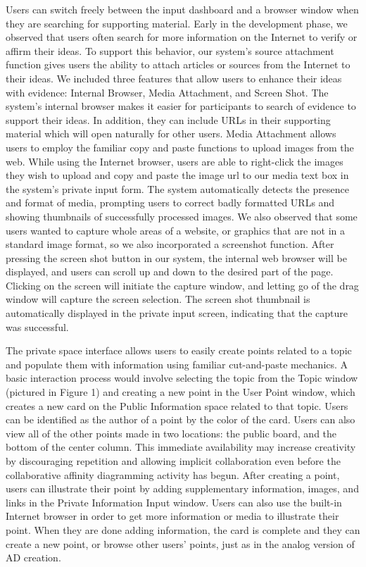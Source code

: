 \documentclass{sigchi}
\begin{document}
Users can switch freely between the input dashboard and a browser window when they are searching for supporting material.  Early in the development phase, we observed that users often search for more information on the Internet to verify or affirm their ideas. To support this behavior, our system's source attachment function gives users the ability to attach articles or sources from the Internet to their ideas. We included three features that allow users to enhance their ideas with evidence: Internal Browser, Media Attachment, and Screen Shot. The system's internal browser makes it easier for participants to search of evidence to support their ideas. In addition, they can include URLs in their supporting material which will open naturally for other users. Media Attachment allows users to employ the familiar copy and paste functions to upload images from the web. While using the Internet browser, users are able to right-click the images they wish to upload and copy and paste the image url to our media text box in the system's private input form. The system automatically detects the presence and format of media, prompting users to correct badly formatted URLs and showing thumbnails of successfully processed images. We also observed that some users wanted to capture whole areas of a website, or graphics that are not in a standard image format, so we also incorporated a screenshot function. After pressing the screen shot button in our system, the internal web browser will be displayed, and users can scroll up and down to the desired part of the page. Clicking on the screen will initiate the capture window, and letting go of the drag window will capture the screen selection. The screen shot thumbnail is automatically displayed in the private input screen, indicating that the capture was successful. 


The private space interface allows users to easily create points related to a topic and populate them with information using familiar cut-and-paste mechanics. A basic interaction process would involve selecting the topic from the Topic window (pictured in Figure 1) and creating a new point in the User Point window, which creates a new card on the Public Information space related to that topic. Users can be identified as the author of a point by the color of the card. Users can also view all of the other points made in two locations: the public board, and the bottom of the center column. This immediate availability may increase creativity by discouraging repetition and allowing implicit collaboration even before the collaborative affinity diagramming activity has begun. After creating a point, users can illustrate their point by adding supplementary information, images, and links in the Private Information Input window. Users can also use the built-in Internet browser in order to get more information or media to illustrate their point. When they are done adding information, the card is complete and they can create a new point, or browse other users' points, just as in the analog version of AD creation.
\end{document}
